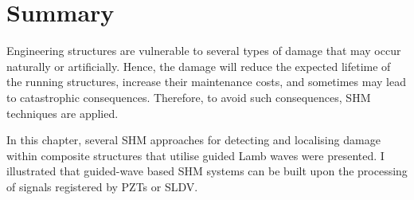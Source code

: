 \section{Summary}
\label{sec24}
Engineering structures are vulnerable to several types of damage that may occur naturally or artificially.
Hence, the damage will reduce the expected lifetime of the running structures, increase their maintenance costs, and sometimes may lead to catastro\-phic consequences. 
Therefore, to avoid such consequences, SHM techniques are applied.

In this chapter,  several SHM approaches for detecting and localising damage within composite structures that utilise guided Lamb waves were presented. 
I illustrated that guided-wave based SHM systems can be built upon the processing of signals registered by PZTs or SLDV. 
